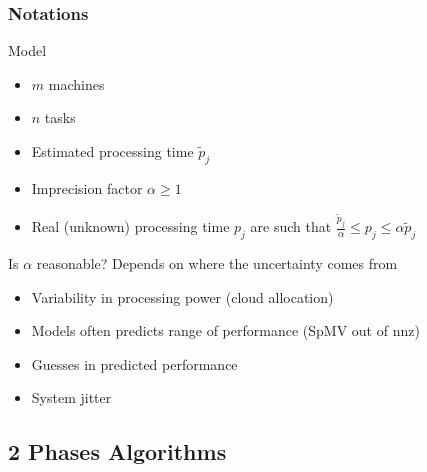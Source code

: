 \documentclass[usenames,dvipsnames]{beamer}
\begin{document}
\begin{frame}
  \frametitle{Notations}

  \begin{block}{Model}
    \begin{itemize}
    \item $m$ machines
    \item $n$ tasks
    \item Estimated processing time $\tilde{p}_j$
    \item Imprecision factor $\alpha \geq 1$
    \item Real (unknown) processing time $p_j$ are such that $\frac{\tilde{p}_{j}}{\alpha}\leq p_{j}\leq \alpha \tilde{p}_{j}$
    \end{itemize}
  \end{block}
  
  \pause

  \begin{block}{Is $\alpha$ reasonable?}
    Depends on where the uncertainty comes from
    \begin{itemize}
    \item Variability in processing power (cloud allocation)
    \item Models often predicts range of performance (SpMV out of nnz)
    \item Guesses in predicted performance
    \item System jitter
    \end{itemize}
  \end{block}
  
\end{frame}

\subsection{2 Phases Algorithms}
\end{document}
